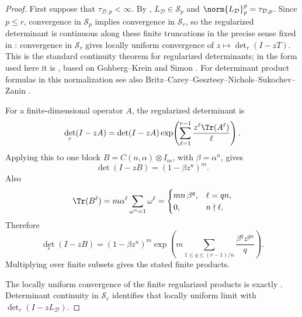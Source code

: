 \begin{proof}
  First suppose that \(\tau_{\mathcal D,p}<\infty\).  By
  ,
  \(L_{\mathcal D}\in\mathcal S_p\) and
  \(\norm{L_{\mathcal D}}_p^p=\tau_{\mathcal D,p}\). Since \(p\le r\),
  convergence in
  \(\mathcal S_p\) implies convergence in \(\mathcal S_r\), so the
  regularized determinant is continuous along these finite truncations in
  the precise sense fixed in
  : convergence in
  \(\mathcal S_r\) gives locally uniform convergence of
  \(z\mapsto\det_r(I-zT)\). This is the standard continuity theorem for
  regularized determinants; in the form used here it is
  \cite[Lemma~2.14, eqs.~(2.77)--(2.79), p.~462]{GesztesyLatushkinMitreaZinchenko2005},
  based on Gohberg--Krein \cite[pp.~162--163]{GohbergKrein1969NonSelfAdjoint}
  and Simon \cite[Chapter~9, Theorems~9.2--9.3]{Simon2005TraceIdeals}.
  For determinant product formulas in this normalization see also
  Britz--Carey--Gesztesy--Nichols--Sukochev--Zanin
  \cite[eq.~(1.3) and the product theorem, eq.~(D.38A)]{BritzCareyGesztesyNicholsSukochevZanin2021}.

  For a finite-dimensional operator \(A\), the regularized determinant is
  \[
    \det_r(I-zA)
    =\det(I-zA)
      \exp\!\left(\sum_{\ell=1}^{r-1}
        \frac{z^\ell\Tr(A^\ell)}{\ell}\right).
  \]
  Applying this to one block
  \(B=C(n,\alpha)\otimes I_m\), with \(\beta=\alpha^n\), gives
  \[
    \det(I-zB)=(1-\beta z^n)^m.
  \]
  Also
  \[
    \Tr(B^\ell)
    =m\alpha^\ell\sum_{\omega^n=1}\omega^\ell
    =
    \begin{cases}
      mn\,\beta^q,& \ell=qn,\\
      0,& n\nmid \ell.
    \end{cases}
  \]
  Therefore
  \[
    \det_r(I-zB)
    =(1-\beta z^n)^m
      \exp\!\left(
        m\sum_{1\le q\le (r-1)/n}
          \frac{\beta^qz^{qn}}{q}
      \right).
  \]
  Multiplying over finite subsets gives the stated finite products.

  The locally uniform convergence of the finite regularized products is
  exactly . Determinant
  continuity in \(\mathcal S_r\) identifies that locally uniform limit with
  \(\det_r(I-zL_{\mathcal D})\).


\end{proof}
